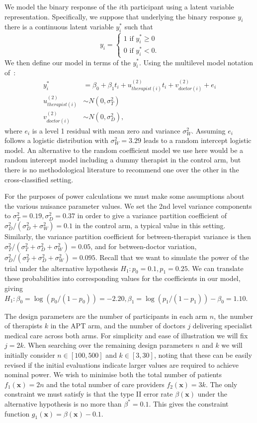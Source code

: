 \documentclass[sagev]{sagej}
\begin{document}
We model the binary response of the $i$th participant using a latent variable representation. Specifically, we suppose that underlying the binary response $y_i$ there is a continuous latent variable $y_i^*$ such that
$$
y_i =
\begin{cases}
1 \text{ if } y_i^* \geq 0\\
0 \text{ if } y_i^* < 0.
\end{cases}
$$
We then define our model in terms of the $y_i^*$. Using the multilevel model notation of~\cite{Goldstein2003}:
\begin{align}\label{eqn:ex1_model}
y_i^* &= \beta_{0} + \beta_1 t_i + u_{therapist(i)}^{(2)}t_{i} + v_{doctor(i)}^{(2)} + e_i \\
u_{therapist(i)}^{(2)} & \sim N(0, \sigma_T^2) \\
v_{doctor(i)}^{(2)} & \sim N(0, \sigma_D^2),
\end{align}
where $e_i$ is a level 1 residual with mean zero and variance $\sigma_W^2$. Assuming $e_i$ follows a logistic distribution with $\sigma_W^2 = 3.29$ leads to a random intercept logistic model. An alternative to the random coefficient model we use here would be a random intercept model including a dummy therapist in the control arm, but there is no methodological literature to recommend one over the other in the cross-classified setting. 

For the purposes of power calculations we must make some assumptions about the various nuisance parameter values. We set the 2nd level variance components to $\sigma_{T}^{2} = 0.19, \sigma_{D}^{2} = 0.37$ in order to give a variance partition coefficient of $\sigma_D^2 / (\sigma^2_D + \sigma^2_W) = 0.1$ in the control arm, a typical value in this setting. Similarly, the variance partition coefficient for between-therapist variance is then $\sigma^2_T/(\sigma^2_T + \sigma^2_D + \sigma^2_W) = 0.05$, and for between-doctor variation, $\sigma^2_D/(\sigma^2_T + \sigma^2_D + \sigma^2_W) = 0.095$. Recall that we want to simulate the power of the trial under the alternative hypothesis $H_1: p_0=0.1, p_1=0.25$. We can translate these probabilities into corresponding values for the coefficients in our model, giving $H_1: \beta_0 = \log(p_0/(1-p_0)) = -2.20, \beta_1 = \log(p_1/(1-p_1)) - \beta_0 = 1.10$.

The design parameters are the number of participants in each arm $n$, the number of therapists $k$ in the APT arm, and the number of doctors $j$ delivering specialist medical care across both arms. For simplicity and ease of illustration we will fix $j = 2k$. When searching over the remaining design parameters $n$ and $k$ we will initially consider $n \in [100, 500]$ and $k \in [3, 30]$, noting that these can be easily revised if the initial evaluations indicate larger values are required to achieve nominal power. We wish to minimise both the total number of patients $f_{1}(\mathbf{x}) = 2n$ and the total number of care providers $f_{2}(\mathbf{x}) = 3k$. The only constraint we must satisfy is that the type II error rate $\beta(\mathbf{x})$ under the alternative hypothesis is no more than $\beta^{*} = 0.1$. This gives the constraint function $g_{1}(\mathbf{x}) = \beta(\mathbf{x}) - 0.1$.
\end{document}
